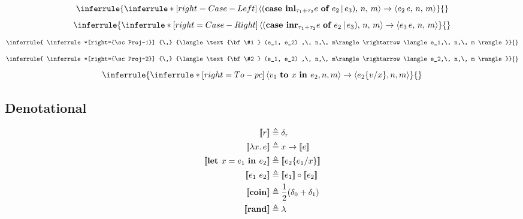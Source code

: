 \documentclass{article}
\begin{document}
\begin{multicols}{2}
				\begin{equation*}
				\inferrule{
				\inferrule*[right={\sc Case-Left}]
				{\,}
				{\langle (\text{\bf case } {\bf inl}_{\tau_1 + \tau_2} e \text{ \bf of } e_2 \,|\, e_3) ,\, n,\, m\rangle \rightarrow \langle e_2\, e,\, n,\, m \rangle}}
				{}
			\end{equation*}
				\begin{equation*}
				\inferrule{
				\inferrule*[right={\sc Case-Right}]
				{\,}
				{\langle (\text{\bf case } {\bf inr}_{\tau_1 + \tau_2} e \text{ \bf of } e_2 \,|\, e_3) ,\, n,\, m\rangle \rightarrow \langle e_3\, e,\, n,\, m \rangle}}
				{}
			\end{equation*}
				\begin{equation*}
				\inferrule{
				\inferrule*[right={\sc Proj-1}]
				{\,}
				{\langle \text{\bf \#1 } (e_1, e_2) ,\, n,\, m\rangle \rightarrow \langle e_1,\, n,\, m \rangle}}
				{}
			\end{equation*}
				\begin{equation*}
				\inferrule{
				\inferrule*[right={\sc Proj-2}]
				{\,}
				{\langle \text{\bf \#2 } (e_1, e_2) ,\, n,\, m\rangle \rightarrow \langle e_2,\, n,\, m \rangle}}
				{}
			\end{equation*}
			\begin{equation*}
				\inferrule{
				\inferrule*[right={\sc To-pc}]
				{\,}
				{\langle v_1 \text{ \bf to } x \text{ \bf in } e_2, n, m \rangle \to 
				\langle e_2 \{v/ x\}, n, m \rangle}}
				{}
			\end{equation*}
		\end{multicols}
		
	\subsection{Denotational}
		\begin{equation*}
		\begin{split}
			[\![r]\!] &\triangleq \delta_r \\
			[\![\lambda x.\, e]\!] &\triangleq x \to [\![e]\!] \\
			[\![\text{\bf let } x = e_1 \text{ \bf in } e_2]\!] &\triangleq [\![e_2\{e_1 / x\}]\!] \\
			[\![e_1 \text{ } e_2]\!] &\triangleq [\![e_1]\!] \circ [\![e_2]\!] \\
			[\![{\bf coin}]\!] &\triangleq \frac{1}{2}(\delta_0 + \delta_1) \\
			[\![{\bf rand}]\!] &\triangleq \lambda \\
		\end{split}
	\end{equation*}
\end{document}
